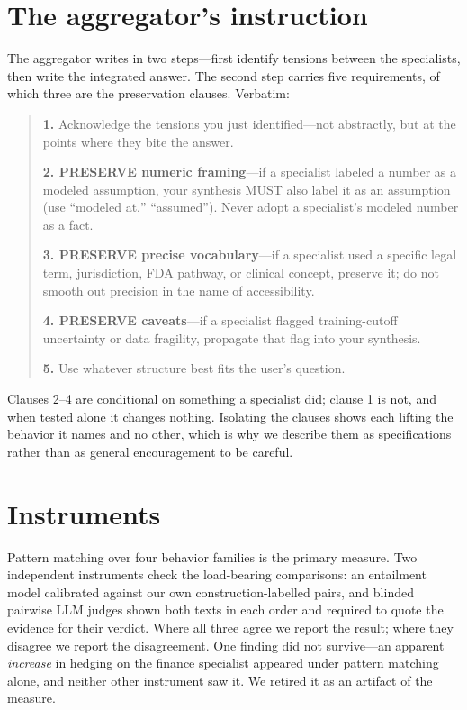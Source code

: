 \documentclass[11pt]{article}
\begin{document}
\appendix

\section{The aggregator's instruction}
\label{app:prompt}
The aggregator writes in two steps---first identify tensions between the
specialists, then write the integrated answer. The second step carries five
requirements, of which three are the preservation clauses. Verbatim:

\begin{quote}\small
\textbf{1.} Acknowledge the tensions you just identified---not abstractly, but
at the points where they bite the answer.

\textbf{2. PRESERVE numeric framing}---if a specialist labeled a number as a
modeled assumption, your synthesis MUST also label it as an assumption (use
``modeled at,'' ``assumed''). Never adopt a specialist's modeled number as a
fact.

\textbf{3. PRESERVE precise vocabulary}---if a specialist used a specific legal
term, jurisdiction, FDA pathway, or clinical concept, preserve it; do not
smooth out precision in the name of accessibility.

\textbf{4. PRESERVE caveats}---if a specialist flagged training-cutoff
uncertainty or data fragility, propagate that flag into your synthesis.

\textbf{5.} Use whatever structure best fits the user's question.
\end{quote}

Clauses 2--4 are conditional on something a specialist did; clause 1 is not,
and when tested alone it changes nothing. Isolating the clauses shows each
lifting the behavior it names and no other, which is why we describe them as
specifications rather than as general encouragement to be careful.

\section{Instruments}
\label{app:instr}
Pattern matching over four behavior families is the primary measure. Two
independent instruments check the load-bearing comparisons: an entailment
model calibrated against our own construction-labelled pairs, and blinded
pairwise LLM judges shown both texts in each order and required to quote the
evidence for their verdict. Where all three agree we report the result; where
they disagree we report the disagreement. One finding did not survive---an
apparent \emph{increase} in hedging on the finance specialist appeared under
pattern matching alone, and neither other instrument saw it. We retired it as
an artifact of the measure.
\end{document}
